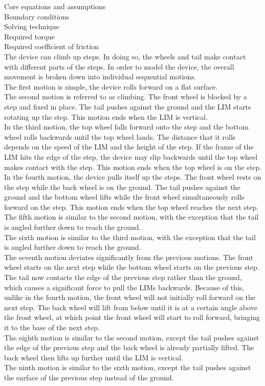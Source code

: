Core equations and assumptions\\
Boundary conditions\\
Solving technique\\
Required torque\\
Required coefficient of friction\\

The device can climb up steps. In doing so, the wheels and tail make contact with different parts of the steps. In order to model the device, the overall movement is broken down into individual sequential motions.\\
The first motion is simple, the device rolls forward on a flat surface.\\
The second motion is referred to as climbing. The front wheel is blocked by a step and fixed in place. The tail pushes against the ground and the LIM starts rotating up the step. This motion ends when the LIM is vertical.\\
In the third motion, the top wheel falls forward onto the step and the bottom wheel rolls backwards until the top wheel lands. The distance that it rolls depends on the speed of the LIM and the height of the step. If the frame of the LIM hits the edge of the step, the device may slip backwards until the top wheel makes contact with the step. This motion ends when the top wheel is on the step.\\
In the fourth motion, the device pulls itself up the steps. The front wheel rests on the step while the back wheel is on the ground. The tail pushes against the ground and the bottom wheel lifts while the front wheel simultaneously rolls forward on the step. This motion ends when the top wheel reaches the next step.\\
The fifth motion is similar to the second motion, with the exception that the tail is angled further down to reach the ground.\\
The sixth motion is similar to the third motion, with the exception that the tail is angled further down to reach the ground.\\
The seventh motion deviates significantly from the previous motions. The front wheel starts on the next step while the bottom wheel starts on the previous step. The tail now contacts the edge of the previous step rather than the ground, which causes a significant force to pull the LIMs backwards. Because of this, unlike in the fourth motion, the front wheel will not initially roll forward on the next step. The back wheel will lift from below until it is at a certain angle above the front wheel, at which point the front wheel will start to roll forward, bringing it to the base of the next step.\\
The eighth motion is similar to the second motion, except the tail pushes against the edge of the previous step and the back wheel is already partially lifted. The back wheel then lifts up further until the LIM is vertical.\\
The ninth motion is similar to the sixth motion, except the tail pushes against the surface of the previous step instead of the ground.